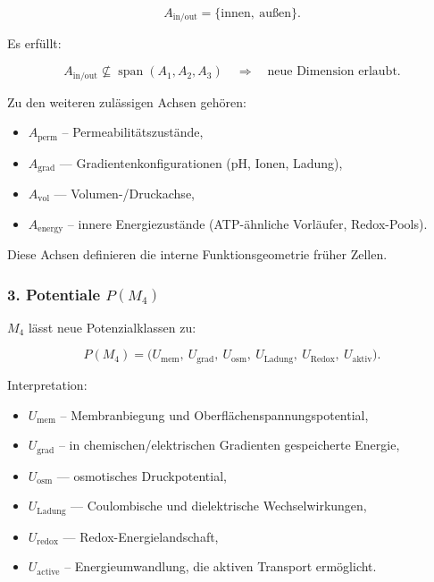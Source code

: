\[
A_{\mathrm{in/out}} = \{ \text{innen},\ \text{außen} \}.
\]

Es erfüllt:

\[
A_{\mathrm{in/out}} \not\subseteq \operatorname{span}(A_1, A_2, A_3)
\quad\Rightarrow\quad
\text{neue Dimension erlaubt}.
\]

Zu den weiteren zulässigen Achsen gehören:

\begin{itemize}
    \item $A_{\mathrm{perm}}$ – Permeabilitätszustände,
    \item $A_{\mathrm{grad}}$ — Gradientenkonfigurationen (pH, Ionen, Ladung),
    \item $A_{\mathrm{vol}}$ — Volumen-/Druckachse,
    \item $A_{\mathrm{energy}}$ – innere Energiezustände
          (ATP-ähnliche Vorläufer, Redox-Pools).
\end{itemize}

Diese Achsen definieren die interne Funktionsgeometrie früher Zellen.

\subsubsection*{3. Potentiale \texorpdfstring{$P(M_4)$}{P(M_4)}}

$M_4$ lässt neue Potenzialklassen zu:

\[
P(M_4) =
\big(
U_{\mathrm{mem}},\
U_{\mathrm{grad}},\
U_{\mathrm{osm}},\
U_{\mathrm{Ladung}},\
U_{\mathrm{Redox}},\
U_{\mathrm{aktiv}}
\Big).
\]

Interpretation:

\begin{itemize}
    \item $U_{\mathrm{mem}}$ – Membranbiegung und Oberflächenspannungspotential,
    \item $U_{\mathrm{grad}}$ – in chemischen/elektrischen Gradienten gespeicherte Energie,
    \item $U_{\mathrm{osm}}$ — osmotisches Druckpotential,
    \item $U_{\mathrm{Ladung}}$ — Coulombische und dielektrische Wechselwirkungen,
    \item $U_{\mathrm{redox}}$ — Redox-Energielandschaft,
    \item $U_{\mathrm{active}}$ – Energieumwandlung, die aktiven Transport ermöglicht.
\end{itemize}

